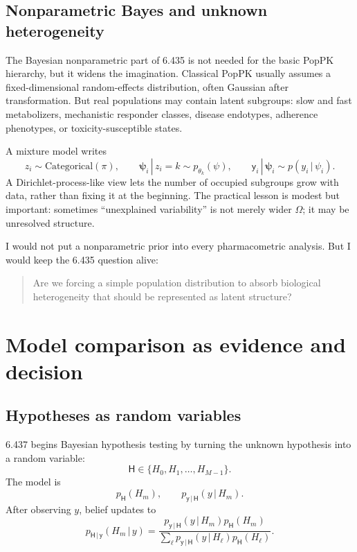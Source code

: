 \documentclass[a4paper]{article}
\newcommand{\rv}[1]{\mathsf{#1}}
\newcommand{\rpsi}{\boldsymbol{\psi}}
\newcommand{\given}{\,|\,}
\begin{document}
\subsection{Nonparametric Bayes and unknown heterogeneity}

The Bayesian nonparametric part of 6.435 is not needed for the basic PopPK hierarchy, but it widens the imagination.  Classical PopPK usually assumes a fixed-dimensional random-effects distribution, often Gaussian after transformation.  But real populations may contain latent subgroups: slow and fast metabolizers, mechanistic responder classes, disease endotypes, adherence phenotypes, or toxicity-susceptible states.

A mixture model writes
\[
  z_i\sim \mathrm{Categorical}(\pi),
  \qquad
  \rpsi_i\given z_i=k\sim p_{\theta_k}(\psi),
  \qquad
  \rv{y}_i\given \rpsi_i\sim p(y_i\given\psi_i).
\]
A Dirichlet-process-like view lets the number of occupied subgroups grow with data, rather than fixing it at the beginning.  The practical lesson is modest but important: sometimes ``unexplained variability'' is not merely wider \(\Omega\); it may be unresolved structure.

I would not put a nonparametric prior into every pharmacometric analysis.  But I would keep the 6.435 question alive:
\begin{quote}
  Are we forcing a simple population distribution to absorb biological heterogeneity that should be represented as latent structure?
\end{quote}

\section{Model comparison as evidence and decision}

\subsection{Hypotheses as random variables}

6.437 begins Bayesian hypothesis testing by turning the unknown hypothesis into a random variable:
\[
  \rv{H}\in\{H_0,H_1,\ldots,H_{M-1}\}.
\]
The model is
\[
  p_{\rv{H}}(H_m),\qquad
  p_{\rv{y}\given \rv{H}}(y\given H_m).
\]
After observing \(y\), belief updates to
\[
  p_{\rv{H}\given \rv{y}}(H_m\given y)
  =
  \frac{
    p_{\rv{y}\given \rv{H}}(y\given H_m)
    p_{\rv{H}}(H_m)
  }{
    \sum_{\ell}
    p_{\rv{y}\given \rv{H}}(y\given H_\ell)
    p_{\rv{H}}(H_\ell)
  }.
\]
\end{document}
